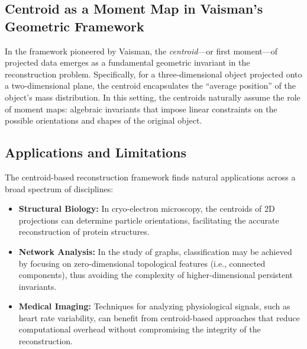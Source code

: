 \documentclass[runningheads]{llncs}
\begin{document}
\subsection{Centroid as a Moment Map in Vaisman's Geometric Framework}
In the framework pioneered by Vaisman, the \emph{centroid}—or first moment—of projected data emerges as a fundamental geometric invariant in the reconstruction problem. Specifically, for a three-dimensional object projected onto a two-dimensional plane, the centroid encapsulates the ``average position” of the object's mass distribution. In this setting, the centroids naturally assume the role of moment maps: algebraic invariants that impose linear constraints on the possible orientations and shapes of the original object. 



\subsection{Applications and Limitations}

The centroid-based reconstruction framework finds natural applications across a broad spectrum of disciplines:
\begin{itemize}
    \item \textbf{Structural Biology:} In cryo-electron microscopy, the centroids of 2D projections can determine particle orientations, facilitating the accurate reconstruction of protein structures.
    \item \textbf{Network Analysis:} In the study of graphs, classification may be achieved by focusing on zero-dimensional topological features (i.e., connected components), thus avoiding the complexity of higher-dimensional persistent invariants.
   \item \textbf{Medical Imaging:} Techniques for analyzing physiological signals, such as heart rate variability, can benefit from centroid-based approaches that reduce computational overhead without compromising the integrity of the reconstruction.
\end{itemize}
\end{document}
